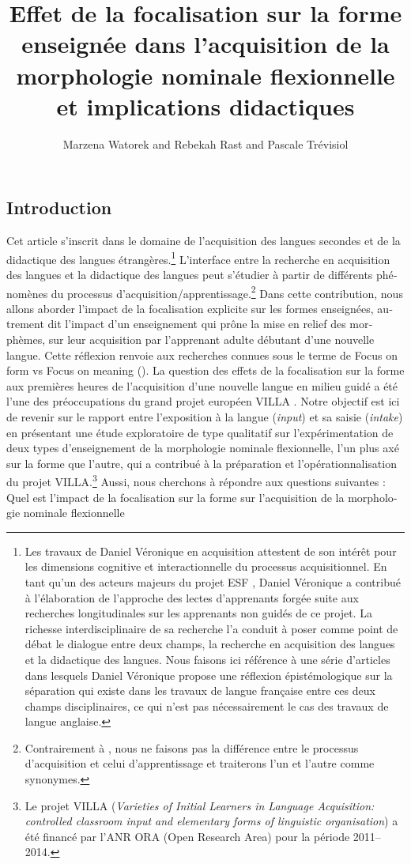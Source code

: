 \documentclass[output=paper]{langscibook}
\author{Marzena Watorek\orcid{}\affiliation{Université de Paris 8; UMR7023} and Rebekah Rast\orcid{}\affiliation{American University of Paris; UMR7023} and Pascale Trévisiol\orcid{}\affiliation{Université Sorbonne Nouvelle; UR DILTEC 2288}}
\title[Focalisation et acquisition de la morphologie flexionnelle]{Effet de la focalisation sur la forme enseignée dans l’acquisition de la morphologie nominale flexionnelle et implications didactiques}
\begin{document}
\begin{otherlanguage}{french}
\lsFrenchChapterSettings{}
\maketitle


\section{Introduction}\label{sec:watorek:intro}
Cet article s’inscrit dans le domaine de l’acquisition des langues secondes et de la didactique des langues étrangères.\footnote{Les travaux de Daniel Véronique en acquisition attestent de son intérêt pour les dimensions cognitive et interactionnelle du processus acquisitionnel. En tant qu’un des acteurs majeurs du projet ESF \citep{Perdue1993}, Daniel Véronique a contribué à l’élaboration de l’approche des lectes d’apprenants forgée suite aux recherches longitudinales sur les apprenants non guidés de ce projet. La richesse interdisciplinaire de sa recherche l’a conduit à poser comme point de débat le dialogue entre deux champs, la recherche en acquisition des langues et la didactique des langues. Nous faisons ici référence à une série d’articles dans lesquels Daniel Véronique propose une réflexion épistémologique sur la séparation qui existe dans les travaux de langue française entre ces deux champs disciplinaires, ce qui n’est pas nécessairement le cas des travaux de langue anglaise.} L’interface entre la recherche en acquisition des langues et la didactique des langues peut s’étudier à partir de différents phénomènes du processus d’acquisition/apprentissage.\footnote{Contrairement à \citet{Krashen1981}, nous ne faisons pas la différence entre le processus d’acquisition et celui d’apprentissage et traiterons l’un et l’autre comme synonymes.} Dans cette contribution, nous allons aborder l’impact de la focalisation explicite sur les formes enseignées, autrement dit l’impact d’un enseignement qui prône la mise en relief des morphèmes, sur leur acquisition par l’apprenant adulte débutant d’une nouvelle langue. Cette réflexion renvoie aux recherches connues sous le terme de Focus on form vs Focus on meaning (\citealt{DoughtyWilliams1998}). La question des effets de la focalisation sur la forme aux premières heures de l’acquisition d’une nouvelle langue en milieu guidé a été l’une des préoccupations du grand projet européen VILLA \citep{DimrothEtAl2013}. Notre objectif est ici de revenir sur le rapport entre l’exposition à la langue (\textit{input}) et sa saisie (\textit{intake}) en présentant une étude exploratoire de type qualitatif sur l’expérimentation de deux types d’enseignement de la morphologie nominale flexionnelle, l’un plus axé sur la forme que l’autre, qui a contribué à la préparation et l’opérationnalisation du projet VILLA.\footnote{Le projet VILLA (\textit{Varieties of Initial Learners in Language Acquisition: controlled classroom input and elementary forms of linguistic organisation}) a été financé par l’ANR ORA (Open Research Area) pour la période 2011--2014.} Aussi, nous cherchons à répondre aux questions suivantes : Quel est l’impact de la focalisation sur la forme sur l’acquisition de la morphologie nominale flexionnelle 
\end{otherlanguage}
\end{document}

